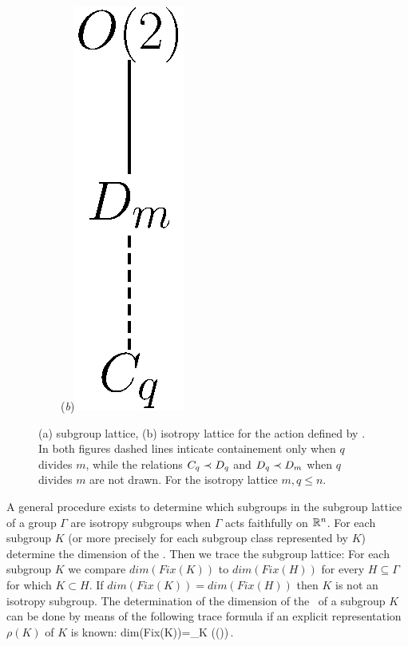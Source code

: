 \begin{example}
\begin{figure}
\begin{center}
~~~~(\textit{b})\includegraphics[height=0.15\textheight]{../figs/O2stablattice}
\end{center}
\caption[O(2) lattices]{
    {\small
    (a)  subgroup lattice, (b)  isotropy lattice for the action
	defined by . In both figures dashed lines inticate
	containement only when $q$ divides $m$, while the relations $C_{q}\prec D_{q}$
	and $D_{q}\prec D_{m}$ when $q$ divides $m$ are not drawn. For the isotropy lattice $m,q\le n$.
	}}
\label{fig:O2lattice}
    \vspace*{-5pt}
\end{figure}

\end{example}

A general procedure exists \cite{gatermannHab} to determine which subgroups in the subgroup lattice of a group $\Gamma$ are isotropy
subgroups when $\Gamma$ acts faithfully on $\mathbb{R}^{n}$.
For each subgroup $K$ (or more precisely for each subgroup class represented by $K$)
determine the dimension of the \fixedsp. Then we trace the subgroup lattice: For each subgroup
$K$ we compare $dim(Fix(K))$ to $dim(Fix(H))$ for every $H\subseteq\Gamma$ for which $K\subset H$.
If  $dim(Fix(K))=dim(Fix(H))$ then $K$ is not an isotropy subgroup. The determination of the dimension of the
\fixedsp\ of a subgroup $K$ can be done by means of the following trace formula if an explicit representation
$\rho(K)$ of $K$ is known:
\beq
	dim(Fix(K))=\sum_{\kappa\in K} \trace(\rho(\kappa))\,.
\eeq

